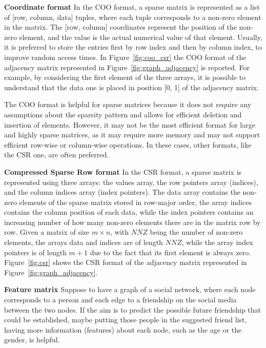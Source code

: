 \textbf{Coordinate format} \newline
In the COO format, a sparse matrix is represented as a list of [row, column, data] tuples, where each tuple corresponds to a non-zero element in the matrix.
The [row, column] coordinates represent the position of the non-zero element, and the value is the actual numerical value of that element.
Usually, it is preferred to store the entries first by row index and then by column index, to improve random access times.
In Figure~\ref{fig:coo_csr} the COO format of the adjacency matrix represented in Figure~\ref{fig:graph_adjacency} is reported.
For example, by considering the first element of the three arrays, it is possible to understand that the data one is placed in position [0, 1] of the adjacency matrix.

The COO format is helpful for sparse matrices because it does not require any assumptions about the sparsity pattern and allows for efficient deletion and insertion of elements.
However, it may not be the most efficient format for large and highly sparse matrices, as it may require more memory and may not support efficient row-wise or column-wise operations.
In these cases, other formats, like the CSR one, are often preferred.

\textbf{Compressed Sparse Row format} \newline
In the CSR format, a sparse matrix is represented using three arrays: the values array, the row pointers array (indices), and the column indices array (index pointers).
The data array contains the non-zero elements of the sparse matrix stored in row-major order, the array indices contains the column position of each data, while the index pointers
contains an increasing number of how many non-zero elements there are in the matrix row by row.
Given a matrix of size $m \times n$, with $NNZ$ being the number of non-zero elements, the arrays data and indices are of length $NNZ$, while the array index pointers is of length $m+1$ due to the fact that its first element is always zero.
Figure~\ref{fig:csr} shows the CSR format of the adjacency matrix represented in Figure~\ref{fig:graph_adjacency}.

\textbf{Feature matrix} \newline
Suppose to have a graph of a social network, where each node corresponds to a person and each edge to a friendship on the social media between the two nodes.
If the aim is to predict the possible future friendship that could be established, maybe putting those people in the suggested friend list, having more information (features) about each node, such as the age or the gender, is helpful.

